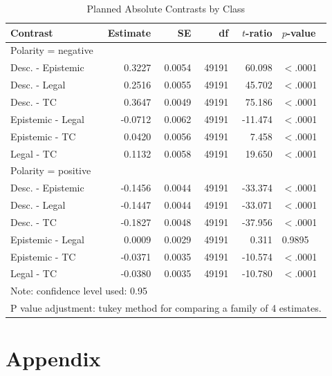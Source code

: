 \documentclass{article}
\begin{document}
\begin{table}[ht]
\centering
\begin{tabular}{lrrrrl}
  \hline
Contrast & Estimate & SE & df & $t$-ratio & $p$-value \\ 
  \hline
\multicolumn{6}{l}{Polarity = negative}\\
\cmidrule{1-1}
\rowcolor{gray!25}Desc. - Epistemic & 0.3227 & 0.0054 & 49191 & 60.098 & $<$.0001 \\ 
  Desc. - Legal & 0.2516 & 0.0055 & 49191 & 45.702 & $<$.0001 \\ 
 \rowcolor{gray!25} Desc. - TC & 0.3647 & 0.0049 & 49191 & 75.186 & $<$.0001 \\ 
  Epistemic - Legal & -0.0712 & 0.0062 & 49191 & -11.474 & $<$.0001 \\ 
 \rowcolor{gray!25} Epistemic - TC & 0.0420 & 0.0056 & 49191 & 7.458 & $<$.0001 \\ 
  Legal - TC & 0.1132 & 0.0058 & 49191 & 19.650 & $<$.0001 \\ 
   \midrule
\multicolumn{6}{l}{Polarity = positive}\\
\cmidrule{1-1}
\rowcolor{gray!25}Desc. - Epistemic & -0.1456 & 0.0044 & 49191 & -33.374 & $<$.0001 \\ 
  Desc. - Legal & -0.1447 & 0.0044 & 49191 & -33.071 & $<$.0001 \\ 
 \rowcolor{gray!25} Desc. - TC & -0.1827 & 0.0048 & 49191 & -37.956 & $<$.0001 \\ 
  Epistemic - Legal & 0.0009 & 0.0029 & 49191 & 0.311 & 0.9895 \\ 
  \rowcolor{gray!25}Epistemic - TC & -0.0371 & 0.0035 & 49191 & -10.574 & $<$.0001 \\ 
  Legal - TC & -0.0380 & 0.0035 & 49191 & -10.780 & $<$.0001 \\ 
   \hline
   \multicolumn{6}{l}{{\footnotesize Note: confidence level used: 0.95}}\\
\multicolumn{6}{l}{{\footnotesize P value adjustment: tukey method for comparing a family of 4 estimates.}}\\
\end{tabular}
\caption{Planned Absolute Contrasts by Class}
\label{tab:s2m2}
\end{table}
\fi




\section{Appendix}
\label{sec:appendix}
\end{document}
